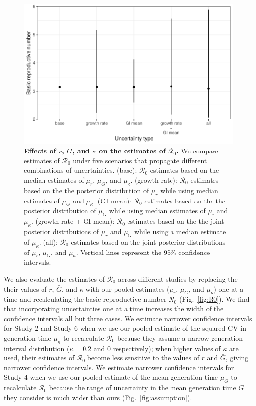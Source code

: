 \documentclass[12pt]{article}
\newcommand{\fref}[1]{Fig.~\ref{fig:#1}}
\begin{document}
\begin{figure}[!ht]
\includegraphics[width=\textwidth]{figure2.pdf}
\caption{
\textbf{Effects of $r$, $\bar G$, and $\kappa$ on the estimates of $\mathcal R_0$.}
We compare estimates of $\mathcal R_0$ under five scenarios that propagate different combinations of uncertainties.
(base): $\mathcal R_0$ estimates based on the median estimates of $\mu_r$, $\mu_G$, and $\mu_\kappa$.
(growth rate): $\mathcal R_0$ estimates based on the the posterior distribution of $\mu_r$ while using median estimates of $\mu_G$ and $\mu_\kappa$.
(GI mean): $\mathcal R_0$ estimates based on the the posterior distribution of $\mu_G$ while using median estimates of $\mu_r$ and $\mu_\kappa$.
(growth rate + GI mean): $\mathcal R_0$ estimates based on the the joint posterior distributions of $\mu_r$ and $\mu_G$ while using a median estimate of $\mu_\kappa$.
(all): $\mathcal R_0$ estimates based on the joint posterior distributions of  $\mu_r$, $\mu_G$, and $\mu_\kappa$.
Vertical lines represent the 95\% confidence intervals.
}
\label{fig:eff}
\end{figure}

We also evaluate the estimates of $\mathcal R_0$ across different studies by 
replacing the their values of $r$, $\bar G$, and $\kappa$ with our pooled estimates ($\mu_r$, $\mu_G$, and $\mu_\kappa$) one at a time and recalculating the basic reproductive number $\mathcal R_0$ (\fref{R0}).
We find that incorporating uncertainties one at a time increases the width of the confidence intervals all but three cases.
We estimate narrower confidence intervals for Study 2 and Study 6 when we use our pooled estimate of the squared CV in generation time $\mu_\kappa$ to recalculate $\mathcal R_0$ because they assume a narrow generation-interval distribution ($\kappa=0.2$ and $0$ respectively);
when higher values of $\kappa$ are used, their estimates of $\mathcal R_0$ become less sensitive to the values of $r$ and $\bar G$, giving narrower confidence intervals.
We estimate narrower confidence intervals for Study 4 when we use our pooled estimate of the mean generation time $\mu_G$ to recalculate $\mathcal R_0$ because the range of uncertainty in the mean generation time $\bar G$ they consider is much wider than ours (\fref{assumption}).
\end{document}

